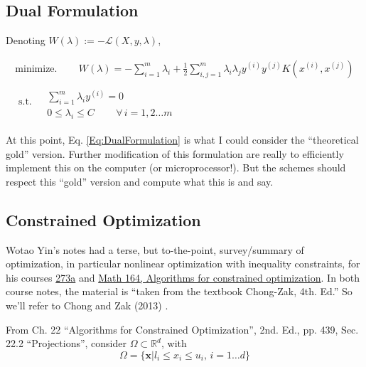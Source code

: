 \documentclass[10pt]{amsart}
\begin{document}
\begin{multicols*}{2}

\subsection{Dual Formulation}\label{Sec:DualFormulation}

Denoting $W(\lambda):= -\mathcal{L}(X,y,\lambda)$, 

\begin{equation}\label{Eq:DualFormulation}
\boxed{ \begin{gathered}
  \text{minimize}. \qquad \, W(\lambda) = -\sum_{i=1}^m \lambda_i +\frac{1}{2} \sum_{i,j=1}^m \lambda_i \lambda_j y^{(i)} y^{(j)} K(x^{(i)},x^{(j)}) \\
  \text{ s.t. } \begin{aligned} & \quad \\
    & \sum_{i=1}^m \lambda_i y^{(i)} = 0  \\
    & 0 \leq \lambda_i \leq C \qquad \, \forall \, i = 1,2 \dots m \end{aligned}
  \end{gathered} }
  \end{equation}

At this point, Eq. \ref{Eq:DualFormulation} is what I could consider the ``theoretical gold'' version.  Further modification of this formulation are really to efficiently implement this on the computer (or microprocessor!).  But the schemes should respect this ``gold'' version and compute what this is and say.  

\subsection{Constrained Optimization}\label{Sec:ConstrainedOptimization}

Wotao Yin's notes had a terse, but to-the-point, survey/summary of optimization, in particular nonlinear optimization with inequality constraints, for his courses \href{http://www.math.ucla.edu/~wotaoyin/math273a/slides/Lec6_NLP_w_inequality_constraints_273a_2015_f.pdf}{273a} and \href{http://www.math.ucla.edu/~wotaoyin/math164/slides/wotao_yin_optimization_lec13_algorithms_for_constrained_optimization.pdf}{Math 164, Algorithms for constrained optimization}.  In both course notes, the material is ``taken from the textbook Chong-Zak, 4th. Ed.''  So we'll refer to Chong and Zak (2013) \cite{ChZa2013}.   

From Ch. 22 ``Algorithms for Constrained Optimization'', 2nd. Ed., pp. 439, Sec. 22.2 ``Projections'', consider $\Omega \subset \mathbb{R}^d$, with \[
\Omega = \lbrace \mathbf{x} | l_i \leq x_i \leq u_i , \, i = 1\dots d\rbrace
\]


\end{multicols*}
\end{document}
